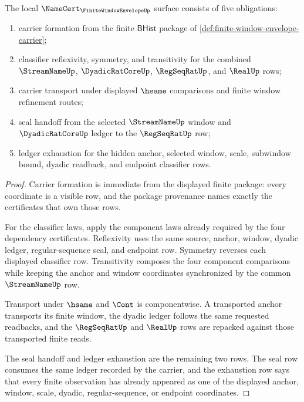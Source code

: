 \begin{theorem}
\label{thm:finite-window-envelope-namecert-obligations}
The local $\NameCert_{\FiniteWindowEnvelopeUp}$ surface consists of five obligations:
\begin{enumerate}
\item carrier formation from the finite $\mathsf{BHist}$ package of \autoref{def:finite-window-envelope-carrier};
\item classifier reflexivity, symmetry, and transitivity for the combined $\StreamNameUp$, $\DyadicRatCoreUp$, $\RegSeqRatUp$, and $\RealUp$ rows;
\item carrier transport under displayed $\hsame$ comparisons and finite window refinement routes;
\item seal handoff from the selected $\StreamNameUp$ window and $\DyadicRatCoreUp$ ledger to the $\RegSeqRatUp$ row;
\item ledger exhaustion for the hidden anchor, selected window, scale, subwindow bound, dyadic readback, and endpoint classifier rows.
\end{enumerate}
\end{theorem}
\begin{proof}
Carrier formation is immediate from the displayed finite package: every coordinate is a visible row, and the package provenance names exactly the certificates that own those rows.

For the classifier laws, apply the component laws already required by the four dependency certificates. Reflexivity uses the same source, anchor, window, dyadic ledger, regular-sequence seal, and endpoint row. Symmetry reverses each displayed classifier row. Transitivity composes the four component comparisons while keeping the anchor and window coordinates synchronized by the common $\StreamNameUp$ row.

Transport under $\hsame$ and $\Cont$ is componentwise. A transported anchor transports its finite window, the dyadic ledger follows the same requested readbacks, and the $\RegSeqRatUp$ and $\RealUp$ rows are repacked against those transported finite reads.

The seal handoff and ledger exhaustion are the remaining two rows. The seal row consumes the same ledger recorded by the carrier, and the exhaustion row says that every finite observation has already appeared as one of the displayed anchor, window, scale, dyadic, regular-sequence, or endpoint coordinates.
\end{proof}

